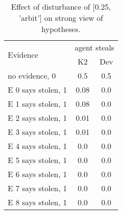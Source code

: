 \begin{table}\begin{tabular}{l|cc}\toprule\multirow{2}{*}{Evidence} & \multicolumn{2}{c}{agent steals}\\& {K2} & {Dev}\\\midrule
no evidence, 0 & 0.5&0.5\\E 0 says stolen, 1 & \cellcolor{Bittersweet}0.08&\cellcolor{Bittersweet}0.0\\E 1 says stolen, 1 & \cellcolor{Bittersweet}0.08&\cellcolor{Bittersweet}0.0\\E 2 says stolen, 1 & 0.01&0.0\\E 3 says stolen, 1 & 0.01&0.0\\E 4 says stolen, 1 & 0.0&0.0\\E 5 says stolen, 1 & 0.0&0.0\\E 6 says stolen, 1 & 0.0&0.0\\E 7 says stolen, 1 & 0.0&0.0\\E 8 says stolen, 1 & 0.0&0.0\\\bottomrule\end{tabular}\caption{Effect of disturbance of [0.25, 'arbit'] on strong view of hypotheses.}\end{table}